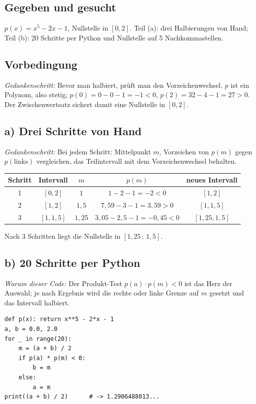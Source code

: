 
\subsection*{Gegeben und gesucht}
$p(x)=x^5-2x-1$, Nullstelle in $[0,2]$. Teil (a): drei Halbierungen von
Hand; Teil (b): 20 Schritte per Python und Nullstelle auf 5 Nachkommastellen.

\subsection*{Vorbedingung}
\emph{Gedankenschritt:} Bevor man halbiert, prüft man den Vorzeichenwechsel.
$p$ ist ein Polynom, also stetig; $p(0)=0-0-1=-1<0$, $p(2)=32-4-1=27>0$.
Der Zwischenwertsatz sichert damit eine Nullstelle in $[0,2]$.

\subsection*{a) Drei Schritte von Hand}
\emph{Gedankenschritt:} Bei jedem Schritt: Mittelpunkt $m$, Vorzeichen von
$p(m)$ gegen $p(\text{links})$ vergleichen, das Teilintervall mit dem
Vorzeichenwechsel behalten.
\begin{center}
\begin{tabular}{c|c|c|c|c}
Schritt & Intervall & $m$ & $p(m)$ & neues Intervall\\\hline
1 & $[0,2]$ & $1$ & $1-2-1=-2<0$ & $[1,2]$\\
2 & $[1,2]$ & $1{,}5$ & $7{,}59-3-1=3{,}59>0$ & $[1,1{,}5]$\\
3 & $[1,1{,}5]$ & $1{,}25$ & $3{,}05-2{,}5-1=-0{,}45<0$ & $[1{,}25,1{,}5]$\\
\end{tabular}
\end{center}
Nach 3 Schritten liegt die Nullstelle in $[1{,}25\,;\,1{,}5]$.

\subsection*{b) 20 Schritte per Python}
\emph{Warum dieser Code:} Der Produkt-Test $p(a)\cdot p(m)<0$ ist das Herz
der Auswahl; je nach Ergebnis wird die rechte oder linke Grenze auf $m$
gesetzt und das Intervall halbiert.
\begin{verbatim}
def p(x): return x**5 - 2*x - 1
a, b = 0.0, 2.0
for _ in range(20):
    m = (a + b) / 2
    if p(a) * p(m) < 0:
        b = m
    else:
        a = m
print((a + b) / 2)      # -> 1.2906488013...
\end{verbatim}

